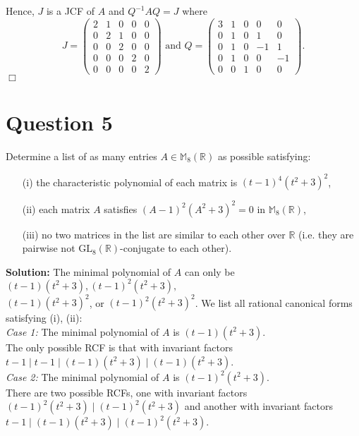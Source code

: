 \documentclass[12pt]{article}
\begin{document}
\noindent Hence, $J$ is a JCF of $A$ and $Q^{-1}AQ = J$ where \[\boxed{J = \begin{pmatrix}
    2 & 1 & 0 & 0 & 0 \\
    0 & 2 & 1 & 0 & 0 \\
    0 & 0 & 2 & 0 & 0 \\
    0 & 0 & 0 & 2 & 0 \\
    0 & 0 & 0 & 0 & 2
\end{pmatrix} \text{ and } Q = \begin{pmatrix}
    3 & 1 & 0 & 0 & 0 \\
    0 & 1 & 0 & 1 & 0 \\
    0 & 1 & 0 & -1 & 1 \\
    0 & 1 & 0 & 0 & -1 \\
    0 & 0 & 1 & 0 & 0
\end{pmatrix}}.\] \hfill $\Box$

\newpage

\section*{Question 5}
Determine a list of as many entries $A \in \mathbb{M}_8(\mathbb{R})$ as possible satisfying:
\begin{enumerate}
    \item[(i)] the characteristic polynomial of each matrix is $(t - 1)^4(t^2 + 3)^2$,
    \item[(ii)] each matrix $A$ satisfies $(A - 1)^2(A^2 + 3)^2 = 0$ in $\mathbb{M}_8(\mathbb{R})$,
    \item[(iii)] no two matrices in the list are similar to each other over $\mathbb{R}$ (i.e. they are pairwise not $\mathrm{GL}_8(\mathbb{R})$-conjugate to each other).
\end{enumerate}

\noindent \textbf{Solution:} The minimal polynomial of $A$ can only be $(t - 1)(t^2 + 3), (t - 1)^2(t^2 + 3),$ \\
$(t - 1)(t^2 + 3)^2$, or $(t - 1)^2(t^2 + 3)^2$. We list all rational canonical forms satisfying (i), (ii): \\

\noindent \textit{Case 1:} The minimal polynomial of $A$ is $(t - 1)(t^2 + 3)$. \\
The only possible RCF is that with invariant factors $t - 1 \mid t - 1 \mid (t - 1)(t^2 + 3) \mid (t - 1)(t^2 + 3)$.  \\

\noindent \textit{Case 2:} The minimal polynomial of $A$ is $(t - 1)^2(t^2 + 3)$. \\
There are two possible RCFs, one with invariant factors $(t - 1)^2(t^2 + 3) \mid (t - 1)^2(t^2 + 3)$ and another with invariant factors $t - 1 \mid (t - 1)(t^2 + 3) \mid (t - 1)^2(t^2 + 3)$. \\
\end{document}
